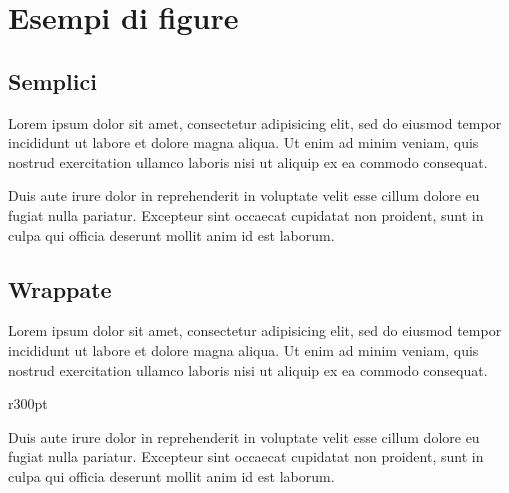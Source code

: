 \documentclass[a4paper, 12pt]{report}
\begin{document}
\section*{Esempi di figure}

\subsection*{Semplici}

Lorem ipsum dolor sit amet, consectetur adipisicing elit, sed do eiusmod
tempor incididunt ut labore et dolore magna aliqua. Ut enim ad minim veniam,
quis nostrud exercitation ullamco laboris nisi ut aliquip ex ea commodo consequat.

\begin{figure}[h]
	\centering
\end{figure}

Duis aute irure dolor in reprehenderit in voluptate velit esse
cillum dolore eu fugiat nulla pariatur. Excepteur sint occaecat cupidatat non
proident, sunt in culpa qui officia deserunt mollit anim id est laborum.

\subsection*{Wrappate}

Lorem ipsum dolor sit amet, consectetur adipisicing elit, sed do eiusmod
tempor incididunt ut labore et dolore magna aliqua. Ut enim ad minim veniam,
quis nostrud exercitation ullamco laboris nisi ut aliquip ex ea commodo consequat.

\begin{wrapfigure}{r}{300pt}
	\centering
	\vspace{-1.5\baselineskip}
	\vspace{-2.5\baselineskip}
\end{wrapfigure}

Duis aute irure dolor in reprehenderit in voluptate velit esse
cillum dolore eu fugiat nulla pariatur. Excepteur sint occaecat cupidatat non
proident, sunt in culpa qui officia deserunt mollit anim id est laborum.
\end{document}
